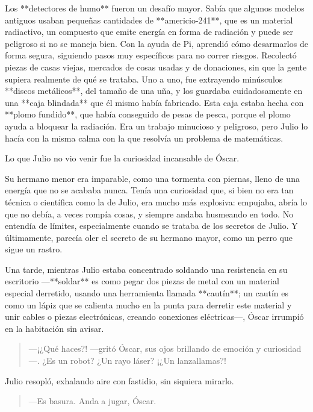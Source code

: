 \documentclass[a4paper,12pt]{book}
\begin{document}
Los **detectores de humo** fueron un desafío mayor. Sabía que algunos modelos antiguos usaban pequeñas cantidades de **americio-241**, que es un material radiactivo, un compuesto que emite energía en forma de radiación y puede ser peligroso si no se maneja bien. Con la ayuda de Pi, aprendió cómo desarmarlos de forma segura, siguiendo pasos muy específicos para no correr riesgos. Recolectó piezas de casas viejas, mercados de cosas usadas y de donaciones, sin que la gente supiera realmente de qué se trataba. Uno a uno, fue extrayendo minúsculos **discos metálicos**, del tamaño de una uña, y los guardaba cuidadosamente en una **caja blindada** que él mismo había fabricado. Esta caja estaba hecha con **plomo fundido**, que había conseguido de pesas de pesca, porque el plomo ayuda a bloquear la radiación. Era un trabajo minucioso y peligroso, pero Julio lo hacía con la misma calma con la que resolvía un problema de matemáticas.

Lo que Julio no vio venir fue la curiosidad incansable de Óscar.

Su hermano menor era imparable, como una tormenta con piernas, lleno de una energía que no se acababa nunca. Tenía una curiosidad que, si bien no era tan técnica o científica como la de Julio, era mucho más explosiva: empujaba, abría lo que no debía, a veces rompía cosas, y siempre andaba husmeando en todo. No entendía de límites, especialmente cuando se trataba de los secretos de Julio. Y últimamente, parecía oler el secreto de su hermano mayor, como un perro que sigue un rastro.

Una tarde, mientras Julio estaba concentrado soldando una resistencia en su escritorio —**soldar** es como pegar dos piezas de metal con un material especial derretido, usando una herramienta llamada **cautín**; un cautín es como un lápiz que se calienta mucho en la punta para derretir este material y unir cables o piezas electrónicas, creando conexiones eléctricas—, Óscar irrumpió en la habitación sin avisar.

\begin{quote}
    —¡¿Qué haces?! —gritó Óscar, sus ojos brillando de emoción y curiosidad—. ¿Es un robot? ¿Un rayo láser? ¡¿Un lanzallamas?!
\end{quote}

Julio resopló, exhalando aire con fastidio, sin siquiera mirarlo.

\begin{quote}
    —Es basura. Anda a jugar, Óscar.
\end{quote}
\end{document}
